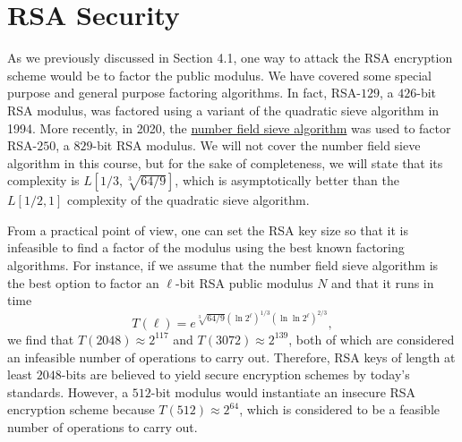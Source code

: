 \section{RSA Security}
As we previously discussed in Section 4.1, one way to attack the RSA encryption 
scheme would be to factor the public modulus. We have covered some special 
purpose and general purpose factoring algorithms. In fact, RSA-$129$, a 
$426$-bit RSA modulus, was factored using a variant of the quadratic sieve 
algorithm in 1994. More recently, in 2020, the 
\href{https://en.wikipedia.org/wiki/General_number_field_sieve}{number field 
sieve algorithm} was used to factor RSA-$250$, a $829$-bit RSA modulus. We will 
not cover the number field sieve algorithm in this course, but for the sake of 
completeness, we will state that its complexity is $L[1/3, \sqrt[3]{64/9}]$, 
which is asymptotically better than the $L[1/2, 1]$ complexity of the quadratic 
sieve algorithm. 

From a practical point of view, one can set the RSA key size so that it is 
infeasible to find a factor of the modulus using the best known factoring algorithms. 
For instance, if we assume that the number field sieve algorithm is the best 
option to factor an $\ell$-bit RSA public modulus $N$ and that it runs in time 
\[ T(\ell) = e^{\sqrt[3]{64/9} (\ln 2^\ell)^{1/3} (\ln\ln 2^\ell)^{2/3}}, \] 
we find that $T(2048) \approx 2^{117}$ and $T(3072) \approx 2^{139}$, 
both of which are considered an infeasible number of operations to carry out. 
Therefore, RSA keys of length at least $2048$-bits are believed to yield 
secure encryption schemes by today's standards. However, a $512$-bit modulus 
would instantiate an insecure RSA encryption scheme because $T(512) \approx 
2^{64}$, which is considered to be a feasible number of operations to carry out. 

